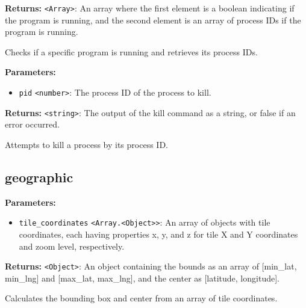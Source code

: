 \documentclass[12pt,a4paper]{article}
\begin{document}
\noindent \textbf{Returns:} \texttt{<Array>}: An array where the first element is a boolean indicating if the program is running, 
                 and the second element is an array of process IDs if the program is running.

\noindent Checks if a specific program is running and retrieves its process IDs.

\vspace{5mm}
\noindent {}


\noindent \textbf{Parameters:}
\begin{itemize}
  \item \texttt{pid} \texttt{<number>}: The process ID of the process to kill.
\end{itemize}

\noindent \textbf{Returns:} \texttt{<string>}: The output of the kill command as a string, or false if an error occurred.

\noindent Attempts to kill a process by its process ID.


\subsection{geographic}
\vspace{5mm}
\noindent {}


\noindent \textbf{Parameters:}
\begin{itemize}
  \item \texttt{tile\_coordinates} \texttt{<Array.<Object>>}: An array of objects with tile coordinates, each having properties \textasciigrave{}x\textasciigrave{}, \textasciigrave{}y\textasciigrave{}, and \textasciigrave{}z\textasciigrave{} for tile X and Y coordinates and zoom level, respectively.
\end{itemize}

\noindent \textbf{Returns:} \texttt{<Object>}: An object containing the bounds as an array of \textasciigrave{}[min\_lat, min\_lng]\textasciigrave{} and \textasciigrave{}[max\_lat, max\_lng]\textasciigrave{}, and the center as \textasciigrave{}[latitude, longitude]\textasciigrave{}.

\noindent Calculates the bounding box and center from an array of tile coordinates.
\end{document}
